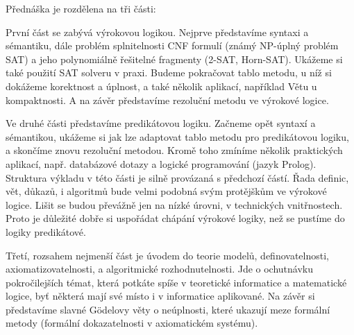 Přednáška je rozdělena na tři části: 

První část se zabývá výrokovou logikou. Nejprve představíme syntaxi a sémantiku, dále problém splnitelnosti CNF formulí (známý NP-úplný problém SAT) a jeho polynomiálně řešitelné fragmenty (2-SAT, Horn-SAT). Ukážeme si také použití SAT solveru v praxi. Budeme pokračovat tablo metodu, u níž si dokážeme korektnost a úplnost, a také několik aplikací, například Větu u kompaktnosti. A na závěr představíme rezoluční metodu ve výrokové logice.

Ve druhé části představíme predikátovou logiku. Začneme opět syntaxí a sémantikou, ukážeme si jak lze adaptovat tablo metodu pro predikátovou logiku, a skončíme znovu rezoluční metodou. Kromě toho zmíníme několik praktických aplikací, např. databázové dotazy a logické programování (jazyk Prolog). Struktura výkladu v této části je silně provázaná s předchozí částí. Řada definic, vět, důkazů, i algoritmů bude velmi podobná svým protějškům ve výrokové logice. Lišit se budou převážně jen na nízké úrovni, v technických vnitřnostech. Proto je důležité dobře si uspořádat chápání výrokové logiky, než se pustíme do logiky predikátové. 

Třetí, rozsahem nejmenší část je úvodem do teorie modelů, definovatelnosti, axiomatizovatelnosti, a algoritmické rozhodnutelnosti. Jde o ochutnávku pokročilejších témat, která potkáte spíše v teoretické informatice a matematické logice, byť některá mají své místo i v informatice aplikované. Na závěr si představíme slavné Gödelovy věty o neúplnosti, které ukazují meze formální metody (formální dokazatelnosti v axiomatickém systému). 

